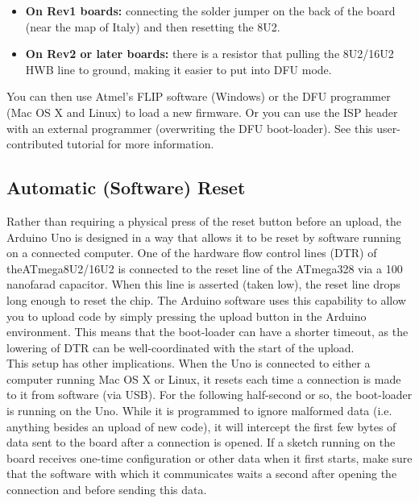 \documentclass[a4paper, 12pt, notitlepage]{report}
\begin{document}
\begin{itemize}
\item \textbf{On Rev1 boards:} connecting the solder jumper on the back of the board (near the map of Italy) and then resetting the 8U2.
\item \textbf{On Rev2 or later boards:} there is a resistor that pulling the 8U2/16U2 HWB line to ground, making it easier to put into DFU mode.

\end{itemize}

You can then use Atmel's FLIP software (Windows) or the DFU programmer (Mac OS X and Linux) to load a new firmware. Or you can use the ISP header with an external programmer (overwriting the DFU boot-loader). See this user-contributed tutorial for more information.\\

\subsection{Automatic (Software) Reset}

Rather than requiring a physical press of the reset button before an upload, the Arduino Uno is designed in a way that allows it to be reset by software running on a connected computer. One of the hardware flow control lines (DTR) of theATmega8U2/16U2 is connected to the reset line of the ATmega328 via a 100 nanofarad capacitor. When this line is asserted (taken low), the reset line drops long enough to reset the chip. The Arduino software uses this capability to allow you to upload code by simply pressing the upload button in the Arduino environment. This means that the boot-loader can have a shorter timeout, as the lowering of DTR can be well-coordinated with the start of the upload.\\

This setup has other implications. When the Uno is connected to either a computer running Mac OS X or Linux, it resets each time a connection is made to it from software (via USB). For the following half-second or so, the boot-loader is running on the Uno. While it is programmed to ignore malformed data (i.e. anything besides an upload of new code), it will intercept the first few bytes of data sent to the board after a connection is opened. If a sketch running on the board receives one-time configuration or other data when it first starts, make sure that the software with which it communicates waits a second after opening the connection and before sending this data.\\
\end{document}
